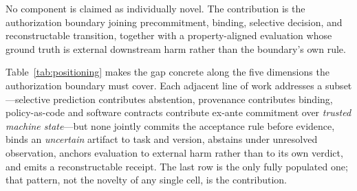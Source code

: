 \documentclass[sigconf,anonymous,review]{acmart}
\begin{document}
No component is claimed as individually novel. The contribution is the authorization boundary joining precommitment, binding, selective decision, and reconstructable transition, together with a property-aligned evaluation whose ground truth is external downstream harm rather than the boundary's own rule.

Table~\ref{tab:positioning} makes the gap concrete along the five dimensions the authorization boundary must cover. Each adjacent line of work addresses a subset---selective prediction contributes abstention, provenance contributes binding, policy-as-code and software contracts contribute ex-ante commitment over \emph{trusted machine state}---but none jointly commits the acceptance rule before evidence, binds an \emph{uncertain} artifact to task and version, abstains under unresolved observation, anchors evaluation to external harm rather than to its own verdict, and emits a reconstructable receipt. The last row is the only fully populated one; that pattern, not the novelty of any single cell, is the contribution.
\end{document}
